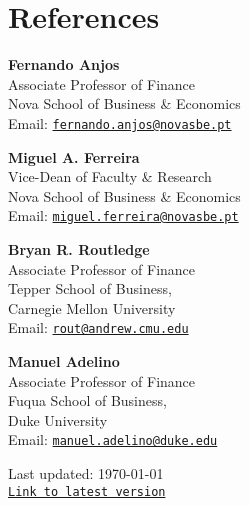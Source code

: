 \documentclass[letterpaper]{article}
\def\footerlink{https://miguelcfoliveira.github.io/CV/CV.pdf}
\begin{document}
\section*{References}
\begin{multicols}{2}
\textbf{Fernando Anjos} \\
Associate Professor of Finance \\
Nova School of Business \& Economics \\
Email: \href{mailto:fernando.anjos@novasbe.pt}{\tt fernando.anjos@novasbe.pt} 
\columnbreak \hfill

\textbf{Miguel A. Ferreira} \\
Vice-Dean of Faculty \& Research \\
Nova School of Business \& Economics \\
Email: \href{mailto:miguel.ferreira@novasbe.pt}{\tt miguel.ferreira@novasbe.pt} 
\end{multicols}

\begin{multicols}{2}
\textbf{Bryan R. Routledge} \\
Associate Professor of Finance \\
Tepper School of Business, \\ 
Carnegie Mellon University \\
Email: \href{mailto:rout@andrew.cmu.edu}{\tt rout@andrew.cmu.edu} 
\columnbreak \hfill

\textbf{Manuel Adelino} \\
Associate Professor of Finance \\
Fuqua School of Business, \\ 
Duke University \\
Email: \href{mailto:manuel.adelino@duke.edu}{\tt manuel.adelino@duke.edu} 
\end{multicols}

\bigskip

\begin{center}
  \begin{footnotesize}
    Last updated: \today \\
    \href{\footerlink}{\texttt{Link to latest version}}
  \end{footnotesize}
\end{center}
\end{document}
